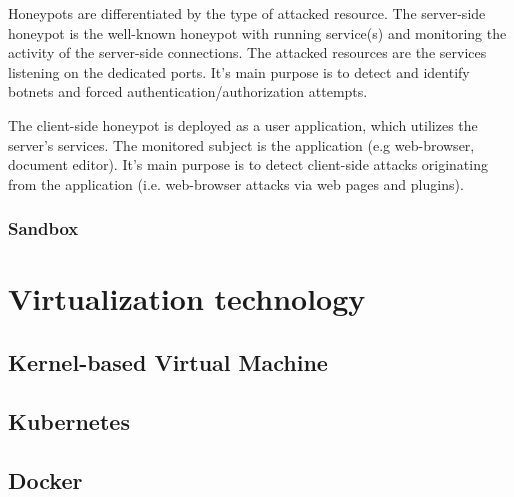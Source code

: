 Honeypots are differentiated by the type of attacked resource. The server-side honeypot is the well-known honeypot with running service(s) and monitoring the activity of the server-side connections. The attacked resources are the services listening on the dedicated ports. It's main purpose is to detect and identify botnets and forced authentication/authorization attempts.

The client-side honeypot is deployed as a user application, which utilizes the server's services. The monitored subject is the application (e.g web-browser, document editor). It's main purpose is to detect client-side attacks originating from the application (i.e. web-browser attacks via web pages and plugins).



\subsubsection{Sandbox \label{anal:malware:mech_envs:sand}}

\section{Virtualization technology \label{anal:virtual}}

\subsection{Kernel-based Virtual Machine \label{anal:virtual:kvm}}



\subsection{Kubernetes \label{anal:virtual:k8s}}

\subsection{Docker \label{anal:virtual:docker}}

